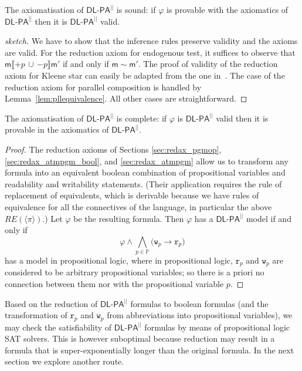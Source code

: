 \documentclass{llncs}
\newcommand{\modl}{\mathsf m}
\newcommand{\pll}{ {||} }							%
\newcommand{\readable}[1]{\mathtt{r}_{#1}}
\newcommand{\writable}[1]{\mathtt{w}_{#1}}
\newcommand{\DlpaPll}{\ensuremath{\mathsf{DL\text{-}PA}^\pll}\xspace}
\newcommand{\assgntopV}[1]{{\mathtt {+} #1}}
\newcommand{\assgnbotV}[1]{{\mathtt {-} #1}}
\newcommand{\intPgm}[1]{\llbracket #1 \rrbracket}
\newcommand{\ldia}[1]{ \big\langle #1 \big\rangle}
\newcommand{\leqv}{ \leftrightarrow }
\newcommand{\limp}{ \rightarrow }
\newcommand{\ndet}{\,{\cup}\,}
\renewcommand{\phi}{\varphi}
\newcommand{\propset}{\mathbb P}
\begin{document}
\begin{theorem}\label{theo:axiomatisationsound}
The axiomatisation of \DlpaPll is sound:
if $\phi$ is provable with the axiomatics of \DlpaPll then it is \DlpaPll valid.
\end{theorem}
\begin{proof}[sketch]
We have to show that the inference rules preserve validity and the axioms are valid. 
For the reduction axiom for endogenous test, it suffices to observe that
$\modl \intPgm{\assgntopV p \ndet \assgnbotV p} \modl'$ if and only if $\modl \sim \modl'$.
The proof of validity of the reduction axiom for Kleene star can easily be adapted from the one in~\cite{BalbianiHerzigTroquard-Lics13}.
The case of the reduction axiom for parallel composition is handled by Lemma~\ref{lem:pllequivalence}.
All other cases are straightforward.
\end{proof}

\begin{theorem}
The axiomatisation of \DlpaPll is complete:
if $\phi$ is \DlpaPll valid then it is provable in the axiomatics of \DlpaPll. 
\end{theorem}
\begin{proof}
The reduction axioms of Sections \ref{sec:redax_pgmop}, \ref{sec:redax_atmpgm_bool}, and \ref{sec:redax_atmpgm} 
allow us to transform any formula into an equivalent boolean combination of 
propositional variables and readability and writability statements. 
(Their application requires the rule of replacement of equivalents, which is derivable 
because we have rules of equivalence for all the connectives of the language, 
in particular the above $RE(\ldia \pi)$.)
Let $\phi$ be the resulting formula. 
Then $\phi$ has a \DlpaPll model if and only if 
$$\phi \land 
\bigwedge_{p \in \propset} \big( \writable{p} \limp \readable p \big) $$
has a model in propositional logic, where in propositional logic,
$\readable p$ and $\writable{p}$ are considered to be arbitrary propositional variables; so
there is a priori no connection between them nor with the propositional variable $p$. 
\end{proof}


Based on the reduction of \DlpaPll formulas to boolean formulas 
(and the transformation of $\readable p$ and $\writable{p}$ from abbreviations into propositional variables),
we may check the satisfiability of \DlpaPll formulas by means of propositional logic SAT solvers. 
This is however suboptimal because reduction may result in a formula that is super-exponentially longer than the original formula. 
In the next section we explore another route.
\end{document}
